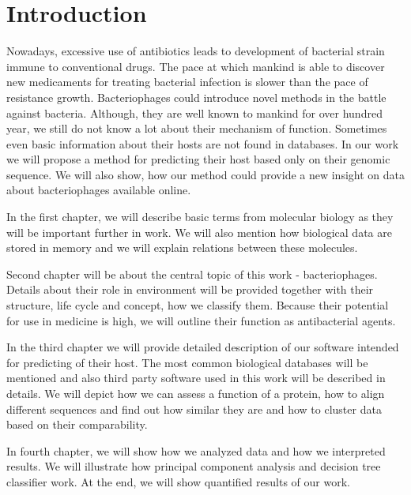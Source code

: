 \chapter*{Introduction} %

Nowadays, excessive use of antibiotics leads to development of bacterial strain immune to conventional drugs.
The pace at which mankind is able to discover new medicaments for treating bacterial infection is slower than the pace of resistance growth.
Bacteriophages could introduce novel methods in the battle against bacteria.
Although, they are well known to mankind for over hundred year, we still do not know a lot about their mechanism of function.
Sometimes even basic information about their hosts are not found in databases.
In our work we will propose a method for predicting their host based only on their genomic sequence.
We will also show, how our method could provide a new insight on data about bacteriophages available online.

In the first chapter, we will describe basic terms from molecular biology as they will be important further in work.
We will also mention how biological data are stored in memory and we will explain relations between these molecules.

Second chapter will be about the central topic of this work - bacteriophages.
Details about their role in environment will be provided together with their structure, life cycle and concept, how we classify them.
Because their potential for use in medicine is high, we will outline their function as antibacterial agents.

In the third chapter we will provide detailed description of our software intended for predicting of their host.
The most common biological databases will be mentioned and also third party software used in this work will be described in details.
We will depict how we can assess a function of a protein, how to align different sequences and find out how similar they are and how to cluster data based on their comparability.

In fourth chapter, we will show how we analyzed data and how we interpreted results.
We will illustrate how principal component analysis and decision tree classifier work.
At the end, we will show quantified results of our work.